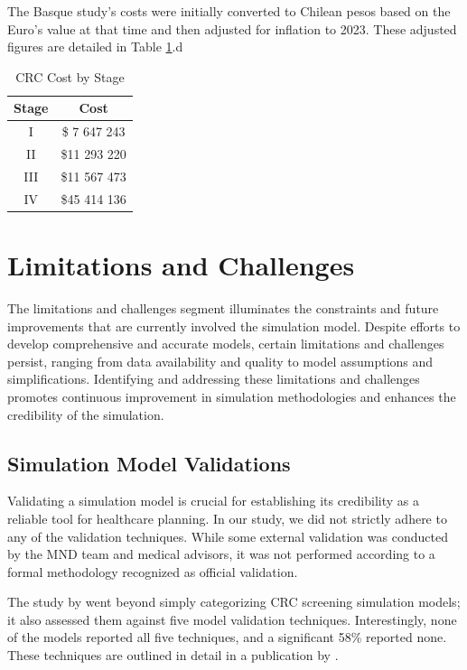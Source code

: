 The Basque study's costs were initially converted to Chilean pesos based on the Euro's value at that time and then adjusted for inflation to 2023. These adjusted figures are detailed in Table \ref{table:crc_cost_by_stage}.d

\begin{table}[H]
\caption{CRC Cost by Stage}
\centering
\begin{tabular}{|c|c|}
\hline
Stage & Cost\\ \hline
I     & \$ 7 647 243\\ \hline
II    & \$11 293 220\\ \hline
III   & \$11 567 473\\ \hline
IV    & \$45 414 136\\ \hline
\end{tabular}
\label{table:crc_cost_by_stage}
\end{table}

\section{Limitations and Challenges}
\label{sec:limitation_and_challenges}

The limitations and challenges segment illuminates the constraints and future improvements that are currently involved the simulation model. Despite efforts to develop comprehensive and accurate models, certain limitations and challenges persist, ranging from data availability and quality to model assumptions and simplifications. Identifying and addressing these limitations and challenges promotes continuous improvement in simulation methodologies and enhances the credibility of the simulation.

\subsection*{Simulation Model Validations}
Validating a simulation model is crucial for establishing its credibility as a reliable tool for healthcare planning. In our study, we did not strictly adhere to any of the validation techniques. While some external validation was conducted by the MND team and medical advisors, it was not performed according to a formal methodology recognized as official validation.

The study by  went beyond simply categorizing CRC screening simulation models; it also assessed them against five model validation techniques. Interestingly, none of the models reported all five techniques, and a significant 58\% reported none. These techniques are outlined in detail in a publication by . 

